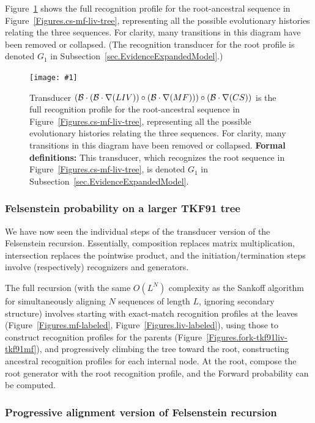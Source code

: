 \documentclass{article}
\newcommand{\secref}[1]{Subsection~\ref{sec.#1}}
\newcommand{\figref}[1]{Figure~\ref{Figures.#1}}
\newcommand{\figlabel}[1]{\label{Figures.#1}}
\newcommand{\easyfig}[4]{
\begin{figure}
\texttt{[image: \#1]}
\caption{ \figlabel{#3} #4}
\end{figure}}
\newcommand{\widepngfig}[2]{\easyfig{#1.png}{width=\textwidth}{#1}{#2}}
\newcommand{\needfig}[1]{{\bf Need figure: } #1 }
\newcommand\tkf{{\cal B}}
\newcommand\formaldefs{{\bf Formal definitions: }}
\newcommand\fork{\circ}
\newcommand\recognize{\nabla}
\begin{document}
\figref{fork3-tkf91liv-tkf91mf-tkf91cs} 
shows  the full recognition profile for the 
root-ancestral sequence in \figref{cs-mf-liv-tree}, 
representing all the possible evolutionary histories relating the three sequences.  
For clarity, many transitions in this diagram have been removed or collapsed.
(The recognition transducer for the root profile is denoted $G_1$ in \secref{EvidenceExpandedModel}.)

\widepngfig{fork3-tkf91liv-tkf91mf-tkf91cs}
{Transducer $(\tkf \cdot (\tkf \cdot \recognize(LIV))\fork(\tkf \cdot \recognize(MF)))\fork(\tkf \cdot \recognize(CS))$ 
is the full recognition profile for the root-ancestral sequence in \figref{cs-mf-liv-tree}, 
representing all the possible evolutionary histories relating the three sequences.  
For clarity, many transitions in this diagram have been removed or collapsed.
\formaldefs
This transducer, which recognizes the root sequence in \figref{cs-mf-liv-tree}, is denoted $G_1$ in \secref{EvidenceExpandedModel}.
}

\subsubsection{Felsenstein probability on a larger TKF91 tree}

We have now seen the individual steps of the 
transducer version of the Felsenstein recursion.
Essentially, composition replaces matrix multiplication, intersection replaces the 
pointwise product, and the initiation/termination steps involve (respectively) recognizers and generators.

The full recursion (with the same $O(L^N)$ complexity as the Sankoff algorithm \cite{SankoffCedergren83}
for simultaneously aligning $N$ sequences of length $L$, ignoring secondary structure)
involves starting with exact-match recognition profiles at the leaves (\figref{mf-labeled}, \figref{liv-labeled}),
using those to construct recognition profiles for the parents (\figref{fork-tkf91liv-tkf91mf}),
and progressively climbing the tree toward the root,
constructing ancestral recognition profiles for each internal node. 
At the root, compose the root generator with the root recognition profile,
and the Forward probability can be computed. 

\subsubsection{Progressive alignment version of Felsenstein recursion}
\end{document}
